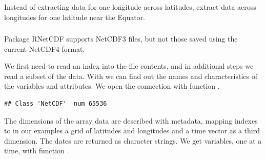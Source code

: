 \documentclass[krantz2,ChapterTOCs]{krantz}\usepackage{knitr}
\begin{document}
\begin{playground}
Instead of extracting data for one longitude across latitudes, extract data across longitudes for one latitude near the Equator.
\end{playground}

\subsubsection[RNetCDF]{}

\begin{warningbox}
Package RNetCDF supports NetCDF3 files, but not those saved using the current NetCDF4 format.
\end{warningbox}

We first need to read an index into the file contents, and in additional steps we read a subset of the data. With  we can find out the names and characteristics of the variables and attributes. We open the connection with function .

\begin{knitrout}\footnotesize
{}\color{fgcolor}\begin{kframe}
\begin{alltt}
 \hlkwb{<-} \hlstd{(}\hlstd{)}
\end{alltt}
\begin{verbatim}
## Class 'NetCDF'  num 65536
\end{verbatim}
\begin{alltt}
\end{alltt}
\end{kframe}
\end{knitrout}

The dimensions of the array data are described with metadata, mapping indexes to in our examples a grid of latitudes and longitudes and a time vector as a third dimension. The dates are returned as character strings. We get variables, one at a time, with function .
\end{document}
